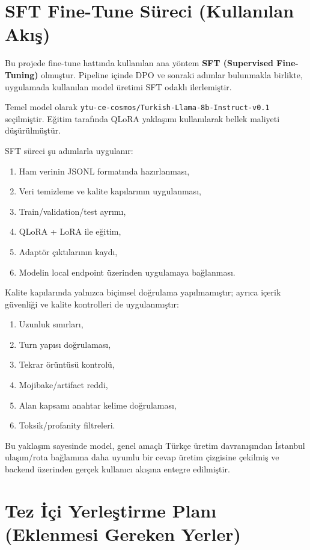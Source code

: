 \section{SFT Fine-Tune Süreci (Kullanılan Akış)}

Bu projede fine-tune hattında kullanılan ana yöntem \textbf{SFT (Supervised Fine-Tuning)} olmuştur. Pipeline içinde DPO ve sonraki adımlar bulunmakla birlikte, uygulamada kullanılan model üretimi SFT odaklı ilerlemiştir.

Temel model olarak \texttt{ytu-ce-cosmos/Turkish-Llama-8b-Instruct-v0.1} seçilmiştir. Eğitim tarafında QLoRA yaklaşımı kullanılarak bellek maliyeti düşürülmüştür.

SFT süreci şu adımlarla uygulanır:
\begin{enumerate}
    \item Ham verinin JSONL formatında hazırlanması,
    \item Veri temizleme ve kalite kapılarının uygulanması,
    \item Train/validation/test ayrımı,
    \item QLoRA + LoRA ile eğitim,
    \item Adaptör çıktılarının kaydı,
    \item Modelin local endpoint üzerinden uygulamaya bağlanması.
\end{enumerate}

Kalite kapılarında yalnızca biçimsel doğrulama yapılmamıştır; ayrıca içerik güvenliği ve kalite kontrolleri de uygulanmıştır:
\begin{enumerate}
    \item Uzunluk sınırları,
    \item Turn yapısı doğrulaması,
    \item Tekrar örüntüsü kontrolü,
    \item Mojibake/artifact reddi,
    \item Alan kapsamı anahtar kelime doğrulaması,
    \item Toksik/profanity filtreleri.
\end{enumerate}

Bu yaklaşım sayesinde model, genel amaçlı Türkçe üretim davranışından İstanbul ulaşım/rota bağlamına daha uyumlu bir cevap üretim çizgisine çekilmiş ve backend üzerinden gerçek kullanıcı akışına entegre edilmiştir.

\section{Tez İçi Yerleştirme Planı (Eklenmesi Gereken Yerler)}

